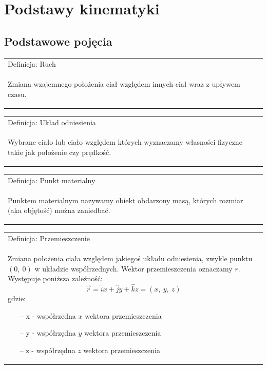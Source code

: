 \documentclass[a4paper]{article}
\newenvironment{definition}[2][Definicja]
    {
        \begin{center}
        \begin{tabular}{|p{1\textwidth}|}
        \hline
            #1: #2\\[2ex]
        \begin{em}
        \Large
    }
    { 
        \end{em}
        \\\hline
        \end{tabular} 
        \end{center}
    }
\begin{document}
\section{\huge Podstawy kinematyki}
    \subsection{\LARGE Podstawowe pojęcia}
        \Large
        \begin{definition}{Ruch}
            Zmiana wzajemnego położenia ciał względem innych ciał wraz z upływem czasu.
        \end{definition}
        \begin{definition}{Układ odniesienia}
            Wybrane ciało lub ciało względem których wyznaczamy własności fizyczne takie jak położenie czy prędkość.
        \end{definition}
        \begin{definition}{Punkt materialny}
            Punktem materialnym nazywamy obiekt obdarzony masą, których rozmiar (aka objętość) można zaniedbać.
        \end{definition}
        \begin{definition}{Przemieszczenie}
            Zmiana położenia ciała względem jakiegoś układu odniesienia, zwykle punktu $(0,\ 0)$ w układzie współrzednych. 
            Wektor przemieszczenia oznaczamy $r$. Występuje poniższa zależność:
            \[\vec{r} = \hat{i}x + \hat{j}y + \hat{k}z = (x,\ y,\ z)\]
            gdzie:
            \begin{itemize}
                \item[--] x - współrzedna $x$ wektora przemieszczenia
                \item[--] y - współrzędna $y$ wektora przemieszczenia
                \item[--] z - współrzędna $z$ wektora przemieszczenia
            \end{itemize}
        \end{definition}
\end{document}
